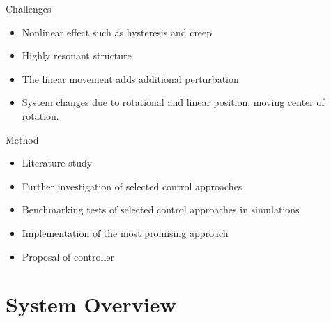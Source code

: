 \documentclass[10pt]{beamer}
\begin{document}
\begin{frame}[fragile]{Challenges}
  \begin{itemize}
    \item Nonlinear effect such as hysteresis and creep
    \item Highly resonant structure
    \item The linear movement adds additional perturbation
    \item System changes due to rotational and linear position, moving center of rotation.
  \end{itemize}
\end{frame}

\begin{frame}[fragile]{Method}
  \begin{itemize}
    \item Literature study
    \item Further investigation of selected control approaches
    \item Benchmarking tests of selected control approaches in simulations
    \item Implementation of the most promising approach
    \item Proposal of controller
  \end{itemize}
\end{frame}

\section{System Overview}
\end{document}

